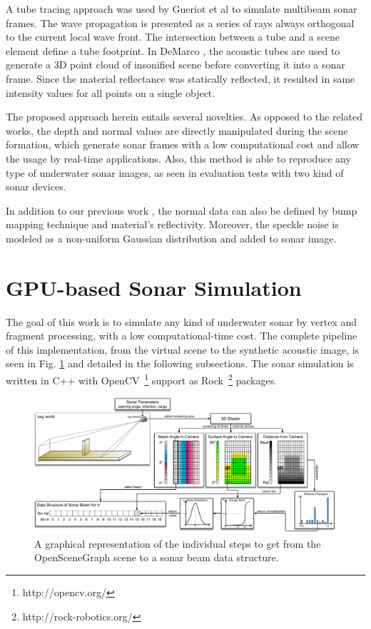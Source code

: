 \documentclass[final,5p,times]{elsarticle}
\begin{document}
A tube tracing approach was used by Gueriot et al \cite{gueriot2010} to simulate multibeam sonar frames. The wave propagation is presented as a series of rays always orthogonal to the current local wave front. The intersection between a tube and a scene element define a tube footprint. In DeMarco \cite{demarco2015}, the acoustic tubes are used to generate a 3D point cloud of insonified scene before converting it into a sonar frame. Since the material reflectance was statically reflected, it resulted in same intensity values for all points on a single object.

The proposed approach herein entails several novelties. As opposed to the related works, the depth and normal values are directly manipulated during the scene formation, which generate sonar frames with a low computational cost and allow the usage by real-time applications. Also, this method is able to reproduce any type of underwater sonar images, as seen in evaluation tests with two kind of sonar devices.

In addition to our previous work \cite{cerqueira2016}, the normal data can also be defined by bump mapping technique and material's reflectivity. Moreover, the speckle noise is modeled as a non-uniform Gaussian distribution and added to sonar image.


\section{GPU-based Sonar Simulation}
\label{dev}

The goal of this work is to simulate any kind of underwater sonar by vertex and fragment processing, with a low computational-time cost. The complete pipeline of this implementation, from the virtual scene to the synthetic acoustic image, is seen in Fig. \ref{fig:sonar_sim} and detailed in the following subsections. The sonar simulation is written in C++ with OpenCV~\footnote{http://opencv.org/} support as Rock~\footnote{http://rock-robotics.org/} packages.

\begin{figure}[!htb]
    \includegraphics[width=0.85\paperwidth]{figs/sonar_sim}
    \centering
    \captionsetup{justification=centering}
    \caption{A graphical representation of the individual steps to get from the OpenSceneGraph scene to a sonar beam data structure.}
    \label{fig:sonar_sim}
\end{figure}
\end{document}
